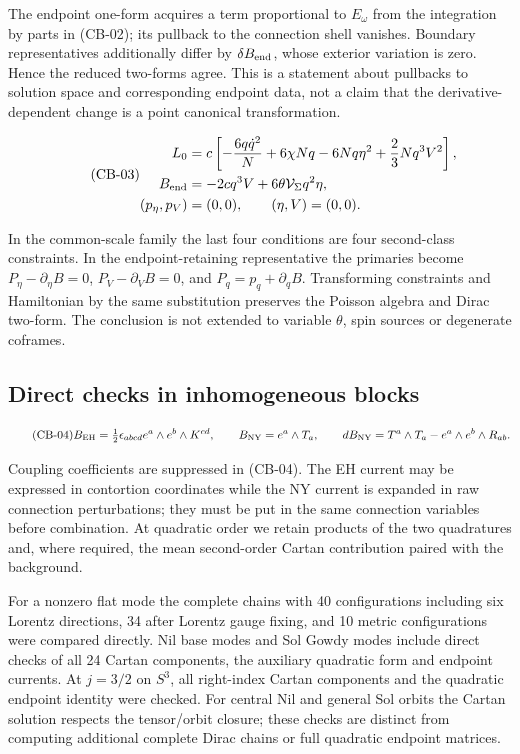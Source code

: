 The endpoint one-form acquires a term proportional to $E_\omega$ from the integration by parts in (CB-02); its pullback to the connection shell vanishes. Boundary representatives additionally differ by $\delta B_{\rm end}$, whose exterior variation is zero. Hence the reduced two-forms agree. This is a statement about pullbacks to solution space and corresponding endpoint data, not a claim that the derivative-dependent change is a point canonical transformation.

\begin{equation}\tag{CB-03}\label{eq:CB-03}
\begin{aligned}L_0&=c\left[-\frac{6q\dot q^2}{N}+6\chi Nq-6Nq\eta^2+\frac23Nq^3V^2\right],\\ B_{\rm end}&=-2cq^3V+6\theta\mathcal V_{\Sigma}q^2\eta,\\ (p_\eta,p_V)&=(0,0),\qquad(\eta,V)=(0,0).\end{aligned}
\end{equation}

In the common-scale family the last four conditions are four second-class constraints. In the endpoint-retaining representative the primaries become $P_\eta-\partial_\eta B=0$, $P_V-\partial_VB=0$, and $P_q=p_q+\partial_qB$. Transforming constraints and Hamiltonian by the same substitution preserves the Poisson algebra and Dirac two-form. The conclusion is not extended to variable $\theta$, spin sources or degenerate coframes.


\subsection{Direct checks in inhomogeneous blocks}

\begin{equation}\tag{CB-04}\label{eq:CB-04}
B_{\rm EH}=\tfrac12\epsilon_{abcd}e^a\wedge e^b\wedge K^{cd},
\qquad B_{\rm NY}=e^a\wedge T_a,\qquad
dB_{\rm NY}=T^a\wedge T_a-e^a\wedge e^b\wedge R_{ab}.
\end{equation}

Coupling coefficients are suppressed in (CB-04). The EH current may be expressed in contortion coordinates while the NY current is expanded in raw connection perturbations; they must be put in the same connection variables before combination. At quadratic order we retain products of the two quadratures and, where required, the mean second-order Cartan contribution paired with the background.

For a nonzero flat mode the complete chains with 40 configurations including six Lorentz directions, 34 after Lorentz gauge fixing, and 10 metric configurations were compared directly. Nil base modes and Sol Gowdy modes include direct checks of all 24 Cartan components, the auxiliary quadratic form and endpoint currents. At $j=3/2$ on $S^3$, all right-index Cartan components and the quadratic endpoint identity were checked. For central Nil and general Sol orbits the Cartan solution respects the tensor/orbit closure; these checks are distinct from computing additional complete Dirac chains or full quadratic endpoint matrices.
